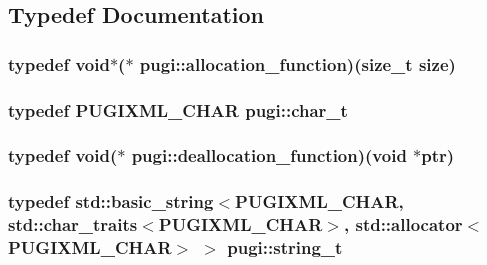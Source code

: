 \subsection{Typedef Documentation}
\hypertarget{namespacepugi_a15c8048c4bbfca2ad0ab9fc0b56ea522}{
\subsubsection[{allocation\-\_\-function}]{\setlength{\rightskip}{0pt plus 5cm}typedef void$\ast$($\ast$ pugi\-::allocation\-\_\-function)(size\-\_\-t size)}}\label{namespacepugi_a15c8048c4bbfca2ad0ab9fc0b56ea522}
\hypertarget{namespacepugi_aef5a7a62cba0507542220ea15afe39df}{
\subsubsection[{char\-\_\-t}]{\setlength{\rightskip}{0pt plus 5cm}typedef {\bf P\-U\-G\-I\-X\-M\-L\-\_\-\-C\-H\-A\-R} {\bf pugi\-::char\-\_\-t}}}\label{namespacepugi_aef5a7a62cba0507542220ea15afe39df}
\hypertarget{namespacepugi_aa6161e8d6344110788d7ff8a11ca680b}{
\subsubsection[{deallocation\-\_\-function}]{\setlength{\rightskip}{0pt plus 5cm}typedef void($\ast$ pugi\-::deallocation\-\_\-function)(void $\ast$ptr)}}\label{namespacepugi_aa6161e8d6344110788d7ff8a11ca680b}
\hypertarget{namespacepugi_a053b39a84c8bb031ff3973d1954a876c}{
\subsubsection[{string\-\_\-t}]{\setlength{\rightskip}{0pt plus 5cm}typedef std\-::basic\-\_\-string$<${\bf P\-U\-G\-I\-X\-M\-L\-\_\-\-C\-H\-A\-R}, std\-::char\-\_\-traits$<${\bf P\-U\-G\-I\-X\-M\-L\-\_\-\-C\-H\-A\-R}$>$, std\-::allocator$<${\bf P\-U\-G\-I\-X\-M\-L\-\_\-\-C\-H\-A\-R}$>$ $>$ {\bf pugi\-::string\-\_\-t}}}\label{namespacepugi_a053b39a84c8bb031ff3973d1954a876c}


